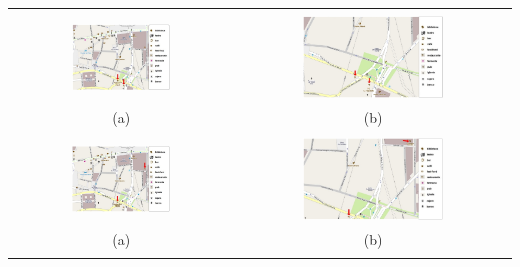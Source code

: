 \noindent
\begin{center}
\begin{tabular}{c c}
& \\
\includegraphics[width=0.46\textwidth]{images/corpus/mapa10.png} & \includegraphics[width=0.53\textwidth]{images/corpus/mapa20.png} \\
(a) & (b) \\
& \\
\includegraphics[width=0.46\textwidth]{images/corpus/mapa9.png} & \includegraphics[width=0.53\textwidth]{images/corpus/mapa19.png} \\
(a) & (b) \\
& \\

\end{tabular}
\end{center}
